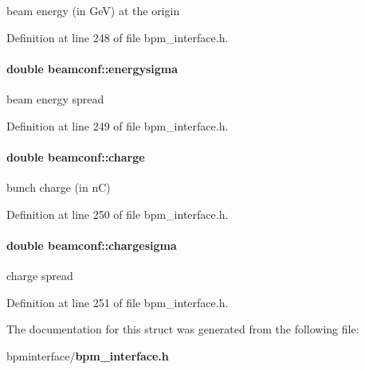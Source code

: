 beam energy (in GeV) at the origin 

Definition at line 248 of file bpm\_\-interface.h.
\paragraph[energysigma]{\setlength{\rightskip}{0pt plus 5cm}double {\bf beamconf::energysigma}}\hfill\label{structbeamconf_3a7e535010155e32742b08a4a7b68415}


beam energy spread 

Definition at line 249 of file bpm\_\-interface.h.
\paragraph[charge]{\setlength{\rightskip}{0pt plus 5cm}double {\bf beamconf::charge}}\hfill\label{structbeamconf_c06ea1a62a94875a08d0ff3ffeed5b18}


bunch charge (in nC) 

Definition at line 250 of file bpm\_\-interface.h.
\paragraph[chargesigma]{\setlength{\rightskip}{0pt plus 5cm}double {\bf beamconf::chargesigma}}\hfill\label{structbeamconf_2bd344a9266ed88379a987c5a845f986}


charge spread 

Definition at line 251 of file bpm\_\-interface.h.

The documentation for this struct was generated from the following file:\begin{CompactItemize}
\item 
bpminterface/{\bf bpm\_\-interface.h}\end{CompactItemize}
